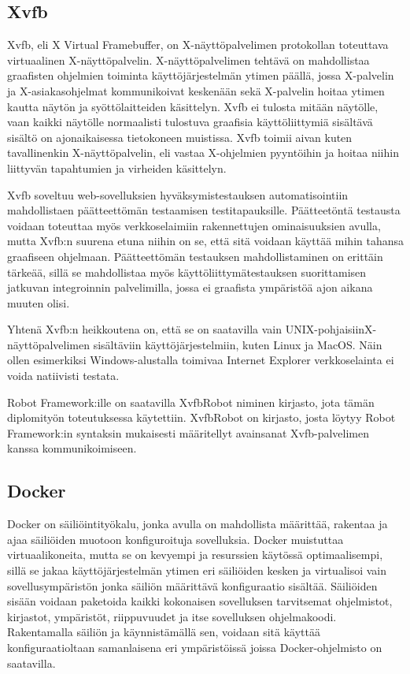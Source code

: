   \subsection{Xvfb} \label{ch:08_xvfb}

    Xvfb, eli X Virtual Framebuffer, on X-näyt\-tö\-pal\-ve\-li\-men  protokollan toteuttava virtuaalinen X-näyt\-tö\-pal\-ve\-lin.
    X-näyt\-tö\-pal\-ve\-li\-men tehtävä on mahdollistaa graafisten ohjelmien toiminta käyttöjärjestelmän ytimen päällä, jossa X-palvelin ja X-asiakasohjelmat kommunikoivat keskenään sekä X-palvelin hoitaa ytimen kautta näytön ja syöttölaitteiden käsittelyn.
    Xvfb ei tulosta mitään näytölle, vaan kaikki näytölle normaalisti tulostuva graafisia käyttöliittymiä sisältävä sisältö on ajonaikaisessa tietokoneen muistissa.
    Xvfb toimii aivan kuten tavallinenkin X-näyt\-tö\-pal\-ve\-lin, eli vastaa X-ohjelmien pyyntöihin ja hoitaa niihin liittyvän tapahtumien ja virheiden käsittelyn.

    Xvfb soveltuu web-sovelluksien hyväksymistestauksen automatisointiin mahdollistaen päätteettömän testaamisen testitapauksille.
    Päätteetöntä testausta voidaan toteuttaa myös verkkoselaimiin rakennettujen ominaisuuksien avulla, mutta Xvfb:n suurena etuna niihin on se, että sitä voidaan käyttää mihin tahansa graafiseen ohjelmaan.
    Päätteettömän testauksen mahdollistaminen on erittäin tärkeää, sillä se mahdollistaa myös käyttöliittymätestauksen suorittamisen jatkuvan integroinnin palvelimilla, jossa ei graafista ympäristöä ajon aikana muuten olisi.

    Yhtenä Xvfb:n heikkoutena on, että se on saatavilla vain UNIX-pohjaisiinX-näyt\-tö\-pal\-ve\-li\-men sisältäviin käyttöjärjestelmiin, kuten Linux ja MacOS.
    Näin ollen esimerkiksi Windows-alustalla toimivaa Internet Explorer verkkoselainta ei voida natiivisti testata.

    Robot Framework:ille on saatavilla XvfbRobot niminen kirjasto, jota tämän diplomityön toteutuksessa käytettiin.
    XvfbRobot on kirjasto, josta löytyy Robot Framework:in syntaksin mukaisesti määritellyt avainsanat Xvfb-palvelimen kanssa kommunikoimiseen.

  \subsection{Docker} \label{ch:08_docker}

    Docker on säiliöintityökalu, jonka avulla on mahdollista määrittää, rakentaa ja ajaa säiliöiden muotoon konfiguroituja sovelluksia.
    Docker muistuttaa virtuaalikoneita, mutta se on kevyempi ja resurssien käytössä optimaalisempi, sillä se jakaa käyttöjärjestelmän ytimen eri säiliöiden kesken ja virtualisoi vain sovellusympäristön jonka säiliön määrittävä konfiguraatio sisältää.
    Säiliöiden sisään voidaan paketoida kaikki kokonaisen sovelluksen tarvitsemat ohjelmistot, kirjastot, ympäristöt, riippuvuudet ja itse sovelluksen ohjelmakoodi.
    Rakentamalla säiliön ja käynnistämällä sen, voidaan sitä käyttää konfiguraatioltaan samanlaisena eri ympäristöissä joissa Docker-ohjelmisto on saatavilla.


